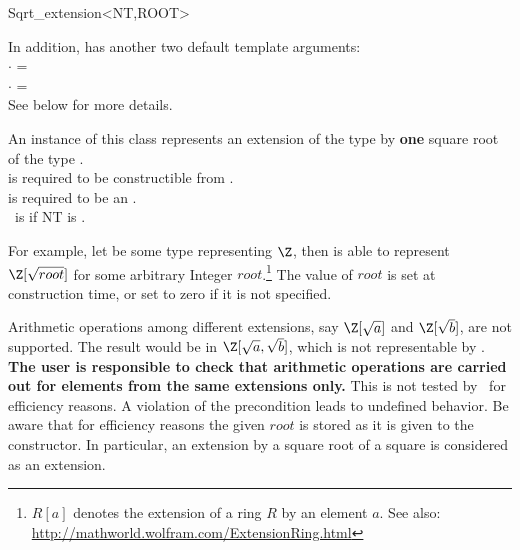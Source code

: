 
\begin{ccRefClass}{Sqrt_extension<NT,ROOT>}
\def\ccTagOperatorLayout{\ccFalse}

In addition,  has another two default template arguments:\\
$\cdot$  = \\
$\cdot$  = \\
See below for more details. 

\ccDefinition

An instance of this class represents an extension of the type  by
\textbf{one} square root of the type . \\ 
 is required to be constructible from . \\
 is required to be an . \\
\ccRefName\ is  if NT is  .



For example, let  be some type representing $\Z$, then 
 is able to represent $\Z[\sqrt{root}]$
for some arbitrary Integer  $root$.\footnote{$R[a]$ denotes the 
extension of a ring $R$ by an element $a$. 
See also: \url{http://mathworld.wolfram.com/ExtensionRing.html}}
The value of $root$ is set at 
construction time, or set to zero if it is not specified.

Arithmetic operations among different extensions, say $\Z[\sqrt{a}]$ 
and $\Z[\sqrt{b}]$, are not supported. 
The result would be in $\Z[\sqrt{a},\sqrt{b}]$, which is not 
representable by . 
\textbf{The user is responsible to check that arithmetic operations 
are carried out for elements from the same extensions only.}
This is not tested by \ccRefName\ for efficiency reasons. 
A violation of the precondition leads to undefined behavior.
Be aware that for efficiency reasons the given $root$ is stored as it is given to 
the constructor. In particular, an extension by a square root of a square is 
considered as an extension.  






\end{ccRefClass}

